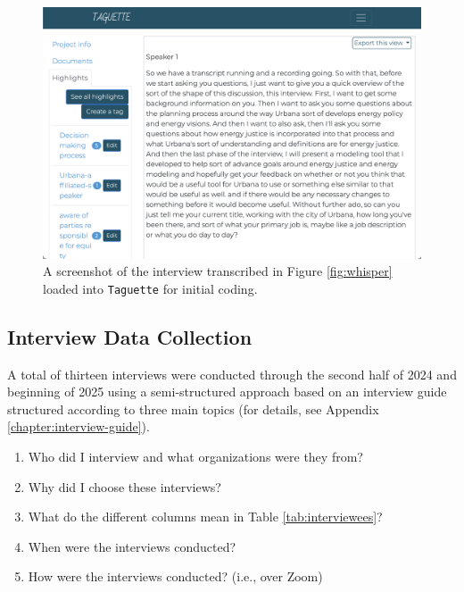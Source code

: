 \begin{figure}[htbp!]
    \centering
    \includegraphics[width=0.6\columnwidth]{figures/07_interview_chapter/taguette-screenshot}
    \caption{A screenshot of the interview transcribed in Figure \ref{fig:whisper}
    loaded into \texttt{Taguette} for initial coding.}
    \label{fig:taguette}
\end{figure}

\subsection{Interview Data Collection}

A total of thirteen interviews were conducted through the second half of 2024
and beginning of 2025 using a semi-structured approach based on an interview
guide structured according to three main topics (for details, see Appendix
\ref{chapter:interview-guide}).

\begin{enumerate}
    \item Who did I interview and what organizations were they from?
    \item Why did I choose these interviews?
    \item What do the different columns mean in Table \ref{tab:interviewees}?
    \item When were the interviews conducted?
    \item How were the interviews conducted? (i.e., over Zoom)
\end{enumerate}
    
